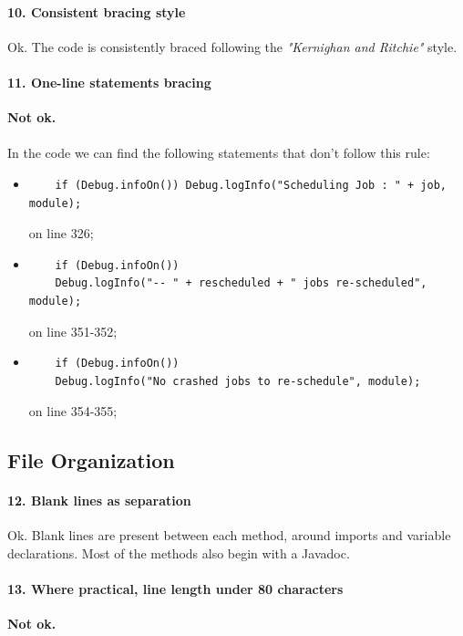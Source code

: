 \documentclass[english]{article}
\begin{document}
\paragraph{10. Consistent bracing style}
Ok.
The code is consistently braced following the \textit{"Kernighan and Ritchie"} style.

\paragraph{11. One-line statements bracing}
\textcolor{cornellred}{\textbf{Not ok.}}
\paragraph{}
In the code we can find the following statements that don't follow this rule:
\begin{itemize}
	\item 
	\begin{lstlisting} 
	if (Debug.infoOn()) Debug.logInfo("Scheduling Job : " + job, module); \end{lstlisting}
	 on line 326;
	\item 
	\begin{lstlisting} 
	if (Debug.infoOn())
    Debug.logInfo("-- " + rescheduled + " jobs re-scheduled", module); \end{lstlisting} 
    on line 351-352;
    \item 
    \begin{lstlisting} 
    if (Debug.infoOn())
    Debug.logInfo("No crashed jobs to re-schedule", module); \end{lstlisting}
     on line 354-355;
\end{itemize}

\subsection{File Organization}
\paragraph{12. Blank lines as separation}
Ok.
Blank lines are present between each method, around imports and variable declarations.
Most of the methods also begin with a Javadoc.

\paragraph{13. Where practical, line length under 80 characters}
\textcolor{cornellred}{\textbf{Not ok.}}
\end{document}
